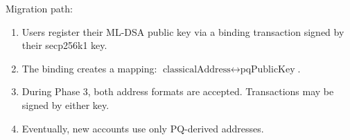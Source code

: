 Migration path:
\begin{enumerate}[leftmargin=2em]
\item Users register their ML-DSA public key via a binding transaction signed by their secp256k1 key.
\item The binding creates a mapping: $\text{classicalAddress} \leftrightarrow \text{pqPublicKey}$.
\item During Phase 3, both address formats are accepted. Transactions may be signed by either key.
\item Eventually, new accounts use only PQ-derived addresses.
\end{enumerate}

